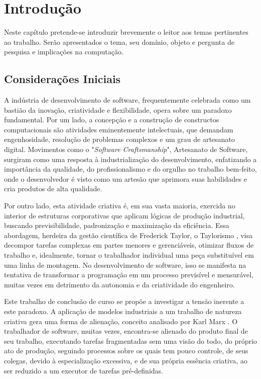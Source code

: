 \chapter{Introdução}\label{cap:introducao}

Neste capítulo pretende-se introduzir brevemente o leitor aos temas pertinentes ao trabalho.
Serão apresentados o tema, seu domínio, objeto e pergunta de pesquisa e 
implicações na computação.
\section{Considerações Iniciais}\label{sec:consideracoes_iniciais}

A indústria de desenvolvimento de software, frequentemente celebrada como um bastião da inovação, criatividade e flexibilidade, opera sobre um paradoxo fundamental. 
Por um lado, 
a concepção e a construção de constructos computacionais são atividades eminentemente intelectuais, que demandam engenhosidade, resolução de problemas complexos e um grau de  
artesanato digital. 
Movimentos como o "\textit{Software Craftsmanship}", Artesanato de Software, surgiram como uma resposta à industrialização do desenvolvimento, enfatizando a 
importância da qualidade, do profissionalismo e do orgulho no trabalho bem-feito, onde o desenvolvedor é visto como um artesão que aprimora suas habilidades e cria produtos de 
alta qualidade.

Por outro lado, esta atividade criativa é, em sua vasta maioria, exercida no interior de estruturas corporativas que aplicam lógicas de produção industrial, buscando 
previsibilidade, padronização e maximização da eficiência. 
Essa abordagem, herdeira da gestão científica de Frederick Taylor, o Taylorismo \cite{Taylor1911}, visa decompor tarefas complexas em 
partes menores e gerenciáveis, otimizar fluxos de trabalho e, idealmente, tornar o trabalhador individual uma peça substituível em uma linha de montagem. 
No desenvolvimento de 
software, isso se manifesta na tentativa de transformar a programação em um processo previsível e mensurável, muitas vezes em detrimento da autonomia e da criatividade do 
engenheiro.

Este trabalho de conclusão de curso se propõe a investigar a tensão inerente a este paradoxo. 
A aplicação de modelos industriais a um trabalho de natureza criativa gera uma 
forma de alienação, conceito analisado por Karl Marx \cite{Marx1844}. 
O trabalhador de software, muitas vezes, encontra-se alienado do produto final de seu trabalho, executando tarefas 
fragmentadas sem uma visão do todo, 
do próprio ato de produção, seguindo processos sobre os quais tem pouco controle, de seus colegas, devido à especialização excessiva, 
e de 
sua própria essência criativa, ao ser reduzido a um executor de tarefas pré-definidas.

